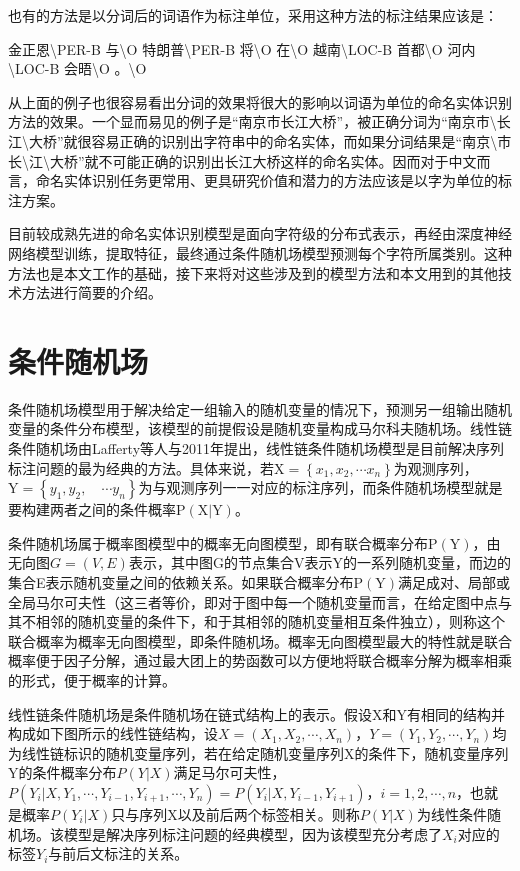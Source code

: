 \documentclass[winfonts,master,oneside,nobackinfo]{njuthesis}
\begin{document}
也有的方法是以分词后的词语作为标注单位，采用这种方法的标注结果应该是：

金正恩\textbackslash PER-B 与\textbackslash O 特朗普\textbackslash PER-B 将\textbackslash O 在\textbackslash O 越南\textbackslash LOC-B 首都\textbackslash O 河内\textbackslash LOC-B 会晤\textbackslash O 。\textbackslash O

从上面的例子也很容易看出分词的效果将很大的影响以词语为单位的命名实体识别方法的效果。一个显而易见的例子是“南京市长江大桥”，被正确分词为“南京市\textbackslash 长江\textbackslash 大桥”就很容易正确的识别出字符串中的命名实体，而如果分词结果是“南京\textbackslash 市长\textbackslash 江\textbackslash 大桥”就不可能正确的识别出长江大桥这样的命名实体。因而对于中文而言，命名实体识别任务更常用、更具研究价值和潜力的方法应该是以字为单位的标注方案。

目前较成熟先进的命名实体识别模型是面向字符级的分布式表示，再经由深度神经网络模型训练，提取特征，最终通过条件随机场模型预测每个字符所属类别。这种方法也是本文工作的基础，接下来将对这些涉及到的模型方法和本文用到的其他技术方法进行简要的介绍。

\section{条件随机场}
条件随机场模型用于解决给定一组输入的随机变量的情况下，预测另一组输出随机变量的条件分布模型，该模型的前提假设是随机变量构成马尔科夫随机场。线性链条件随机场由Lafferty等人\cite{Lafferty}与2011年提出，线性链条件随机场模型是目前解决序列标注问题的最为经典的方法。具体来说，若$\mathrm { X } = \left\{ x _ { 1 } , x _ { 2 } , \cdots x _ { n } \right\}$为观测序列，$\mathrm { Y } = \left\{ y _ { 1 } , y _ { 2 } , \quad \cdots y _ { n } \right\}$为与观测序列一一对应的标注序列，而条件随机场模型就是要构建两者之间的条件概率$\mathrm { P } ( \mathrm { X } | \mathrm { Y } )$。

条件随机场属于概率图模型中的概率无向图模型，即有联合概率分布$\mathrm { P } (\mathrm { Y } )$，由无向图$G = ( V , E )$表示，其中图G的节点集合V表示Y的一系列随机变量，而边的集合E表示随机变量之间的依赖关系。如果联合概率分布$\mathrm { P } (\mathrm { Y } )$满足成对、局部或全局马尔可夫性（这三者等价，即对于图中每一个随机变量而言，在给定图中点与其不相邻的随机变量的条件下，和于其相邻的随机变量相互条件独立），则称这个联合概率为概率无向图模型，即条件随机场。概率无向图模型最大的特性就是联合概率便于因子分解，通过最大团上的势函数可以方便地将联合概率分解为概率相乘的形式，便于概率的计算。

线性链条件随机场是条件随机场在链式结构上的表示。假设X和Y有相同的结构并构成如下图所示的线性链结构，设$X = \left( X _ { 1 } , X _ { 2 } , \cdots , X _ { n } \right)$，$Y = \left( Y _ { 1 } , Y _ { 2 } , \cdots , Y _ { n } \right)$均为线性链标识的随机变量序列，若在给定随机变量序列X的条件下，随机变量序列Y的条件概率分布$P ( Y | X )$满足马尔可夫性，$P \left( Y _ { i } | X , Y _ { 1 } , \cdots , Y _ { i - 1 } , Y _ { i + 1 } , \cdots , Y _ { n } \right) = P \left( Y _ { i } | X , Y _ { i - 1 } , Y _ { i + 1 } \right)$，$i = 1,2 , \cdots , n$，也就是概率$P (Y_{i}|X)$只与序列X以及前后两个标签相关。则称$P ( Y | X )$为线性条件随机场。该模型是解决序列标注问题的经典模型，因为该模型充分考虑了$X _ { i }$对应的标签$Y _ { i }$与前后文标注的关系。
\end{document}
